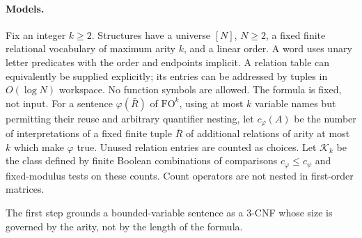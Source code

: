 \documentclass[11pt]{article}
\theoremstyle{definition}
\theoremstyle{remark}
\begin{document}
\paragraph{Models.}
Fix an integer $k\geq2$. Structures have a universe $[N]$, $N\geq2$,
a fixed finite relational vocabulary of maximum arity $k$, and a linear
order. A word uses unary letter predicates with the order and endpoints
implicit. A relation table can equivalently be supplied explicitly;
its entries can be addressed by tuples in $O(\log N)$ workspace.
No function symbols are allowed. The formula is fixed, not input.
For a sentence $\varphi(\bar R)$ of $\mathrm{FO}^k$, using at most
$k$ variable names but permitting their reuse and arbitrary quantifier
nesting, let $c_\varphi(A)$ be the number of interpretations of a fixed
finite tuple $\bar R$ of additional relations of arity at most $k$
which make $\varphi$ true. Unused relation entries are counted as choices.
Let $\mathcal K_k$ be the class defined by finite Boolean combinations
of comparisons $c_\varphi\leq c_\psi$ and fixed-modulus tests on these
counts. Count operators are not nested in first-order matrices.

The first step grounds a bounded-variable sentence as a 3-CNF whose
size is governed by the arity, not by the length of the formula.
\end{document}
